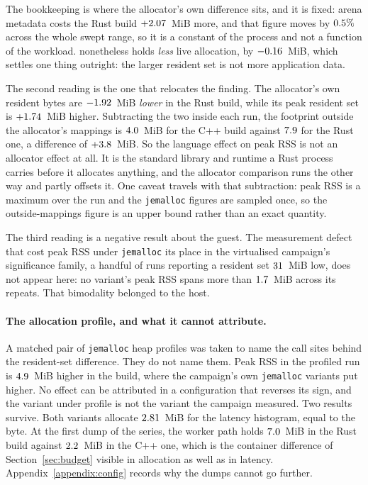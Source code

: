 \documentclass[english,oneside,a4paper,censored,csm,software-track-2020]{HYthesisML}
\begin{document}
The bookkeeping is where the allocator's own difference sits, and it is fixed: arena metadata costs
the Rust build $+2.07$~MiB more, and that figure moves by $0.5\%$ across the
whole swept range, so it is a constant of the process and not a function of the workload.
\BmJeLiveLower{} nonetheless holds \emph{less} live allocation, by $-0.16$~MiB, which
settles one thing outright: the larger resident set is not more application data.

The second reading is the one that relocates the finding. The allocator's own resident bytes are
$-1.92$~MiB \emph{lower} in the Rust build, while its peak resident set is
$+1.74$~MiB higher. Subtracting the two inside each run, the footprint outside the
allocator's mappings is $4.0$~MiB for the C++ build against $7.9$ for the
Rust one, a difference of $+3.8$~MiB. So the language effect on peak RSS is not an
allocator effect at all. It is the standard library and runtime a Rust process carries before it
allocates anything, and the allocator comparison runs the other way and partly offsets it. One
caveat travels with that subtraction: peak RSS is a maximum over the run and the
\texttt{jemalloc} figures are sampled once, so the outside-mappings figure is an upper bound rather
than an exact quantity.

The third reading is a negative result about the guest. The measurement defect that cost peak RSS
under \texttt{jemalloc} its place in the virtualised campaign's significance family, a handful of
runs reporting a resident set $31$~MiB low, does not appear here: no variant's peak
RSS spans more than $1.7$~MiB across its repeats. That bimodality belonged to the host.

\paragraph{The allocation profile, and what it cannot attribute.}
A matched pair of \texttt{jemalloc} heap profiles was taken to name the call sites behind the
resident-set difference. They do not name them. Peak RSS in the profiled run is
$4.9$~MiB higher in the \BmProfRssHigher{} build, where the campaign's own
\texttt{jemalloc} variants put \BmProfCampaignHigher{} higher. No effect can be attributed in a
configuration that reverses its sign, and the variant under profile is not the variant the campaign
measured. Two results survive. Both variants allocate $2.81$~MiB for the latency
histogram, equal to the byte. At the first dump of the series, the worker path holds
$7.0$~MiB in the Rust build against $2.2$~MiB in the C++ one, which
is the container difference of Section~\ref{sec:budget} visible in allocation as well as in
latency. Appendix~\ref{appendix:config} records why the dumps cannot go further.
\end{document}

